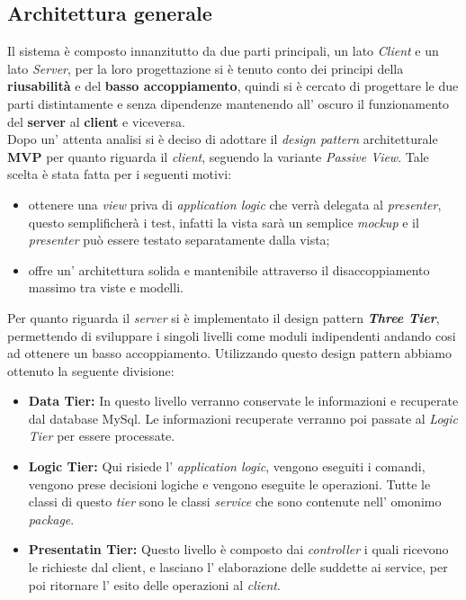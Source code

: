 \subsection{Architettura generale}
Il sistema \progetto{} è composto innanzitutto da due parti principali, un lato \textit{Client} e un lato \textit{Server}, per la loro progettazione si è tenuto conto dei principi della \textbf{riusabilità} e del \textbf{basso accoppiamento}, quindi si è cercato di progettare le due parti distintamente e senza dipendenze mantenendo all' oscuro il funzionamento del \textbf{server} al \textbf{client} e viceversa.\\
Dopo un' attenta analisi si è deciso di adottare il \textit{design pattern} architetturale \textbf{MVP} per quanto riguarda il \textit{client}, seguendo la variante \textit{Passive View}. Tale scelta è stata fatta per i seguenti motivi:
\begin{itemize}
	\item ottenere una \textit{view} priva di \textit{application logic} che verrà delegata al \textit{presenter}, questo semplificherà i test, infatti la vista sarà un semplice \textit{mockup} e il \textit{presenter} può essere testato separatamente dalla vista;
	\item offre un' architettura solida e mantenibile attraverso il disaccoppiamento massimo tra viste e modelli.
\end{itemize}
Per quanto riguarda il \textit{server} si è implementato il design pattern \textbf{\textit{Three Tier}}, permettendo di sviluppare i singoli livelli come moduli indipendenti andando cosi ad ottenere un basso accoppiamento. Utilizzando questo design pattern abbiamo ottenuto la seguente divisione:
\begin{itemize}
	\item \textbf{Data Tier: } In questo livello verranno conservate le informazioni e recuperate dal database MySql. Le informazioni recuperate verranno poi passate al \textit{Logic Tier} per essere processate. 
	\item \textbf{Logic Tier: } Qui risiede l' \textit{application logic}, vengono eseguiti i comandi, vengono prese decisioni logiche e vengono eseguite le operazioni. Tutte le classi di questo \textit{tier} sono le classi \textit{service} che sono contenute nell' omonimo \textit{package}.
	\item \textbf{Presentatin Tier: } Questo livello è composto dai \textit{controller} i quali ricevono le richieste dal client, e lasciano l' elaborazione delle suddette ai service, per poi ritornare l' esito delle operazioni al \textit{client}.
\end{itemize}
